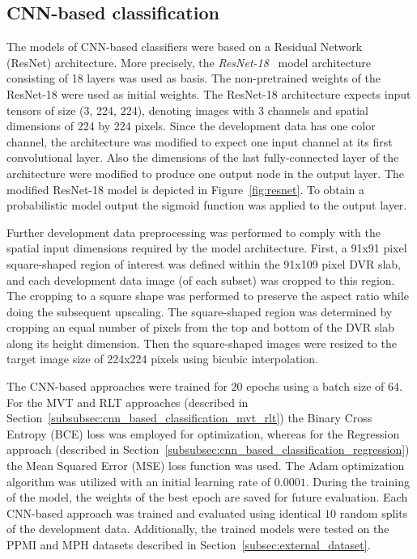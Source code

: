 \subsection{CNN-based classification}
\label{subsec:cnn_based_classification}

The models of CNN-based classifiers were based on a Residual Network \\(ResNet) architecture.
More precisely, the \textit{ResNet-18}~\citep{resnet2015} model architecture consisting of 18 layers was used as basis.
The non-pretrained weights of the ResNet-18 were used as initial weights.
The ResNet-18 architecture expects input tensors of size (3, 224, 224), 
denoting images with 3 channels and spatial dimensions of 224 by 224 pixels.
Since the development data has one color channel, the architecture was modified to expect one input channel at its 
first convolutional layer.
Also the dimensions of the last fully-connected layer of the architecture were modified to produce one output node 
in the output layer.
The modified ResNet-18 model is depicted in Figure~\ref{fig:resnet}.
To obtain a probabilistic model output the sigmoid function was applied to the output layer.

Further development data preprocessing was performed to comply with the spatial input 
dimensions required by the model architecture.
First, a 91x91 pixel square-shaped region of interest was defined within the 91x109 pixel DVR slab, 
and each development data image (of each subset) was cropped to this region.
The cropping to a square shape was performed to preserve the aspect ratio while doing the subsequent upscaling.
The square-shaped region was determined by cropping an equal number of pixels from the top and bottom 
of the DVR slab along its height dimension.
Then the square-shaped images were resized to the target image size of 224x224 pixels using bicubic interpolation.

The CNN-based approaches were trained for $20$ epochs using a batch size of $64$.
For the MVT and RLT approaches (described in Section~\ref{subsubsec:cnn_based_classification_mvt_rlt}) 
the Binary Cross Entropy (BCE) loss was employed for optimization, 
whereas for the Regression approach (described in Section~\ref{subsubsec:cnn_based_classification_regression}) 
the Mean Squared Error (MSE) loss function was used.
The Adam optimization algorithm was utilized with an initial learning rate of $0.0001$.
During the training of the model, the weights of the best epoch are saved for future evaluation.
Each CNN-based approach was trained and evaluated using identical $10$ random splits of the development data.
Additionally, the trained models were tested on the PPMI and MPH datasets described in Section~\ref{subsec:external_dataset}.


